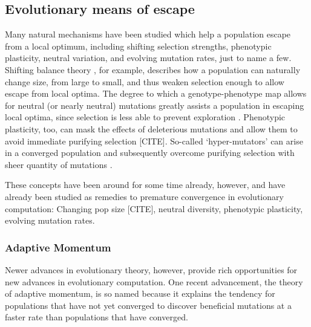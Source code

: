 \subsection{Evolutionary means of escape}
Many natural mechanisms have been studied which help a population escape from a local optimum, including shifting selection strengths, phenotypic plasticity, neutral variation, and evolving mutation rates, just to name a few.
Shifting balance theory \citep{wright1932roles,wright1982shifting}, for example, describes how a population can naturally change size, from large to small, and thus weaken selection enough to allow escape from local optima.
The degree to which a genotype-phenotype map allows for neutral\citep{kimura1983neutral,kimura1991neutral} (or nearly neutral\citep{ohta1992nearly,ohta2002near}) mutations greatly assists a population in escaping local optima, since selection is less able to prevent exploration \citep{oliveto2017how}.
Phenotypic plasticity, too, can mask the effects of deleterious mutations and allow them to avoid immediate purifying selection [CITE].
So-called `hyper-mutators' can arise in a converged population and subsequently overcome purifying selection with sheer quantity of mutations \citep{goodman2016better}.

These concepts have been around for some time already, however, and have already been studied as remedies to premature convergence in evolutionary computation: Changing pop size [CITE], neutral diversity\citep{hu2025neutrality,banzhaf1994genotypephenotypemapping}, phenotypic plasticity\citep{behera1997effect,borenstein2006effect}, evolving mutation rates\citep{back1994parallel,smit2009comparing,kramer2010evolutionary}. %



\subsubsection{Adaptive Momentum}
Newer advances in evolutionary theory, however, provide rich opportunities for new advances in evolutionary computation.
One recent advancement, the theory of adaptive momentum\citep{bohm2024reduced}, is so named because it explains the tendency for populations that have not yet converged to discover beneficial mutations at a faster rate than populations that have converged.

